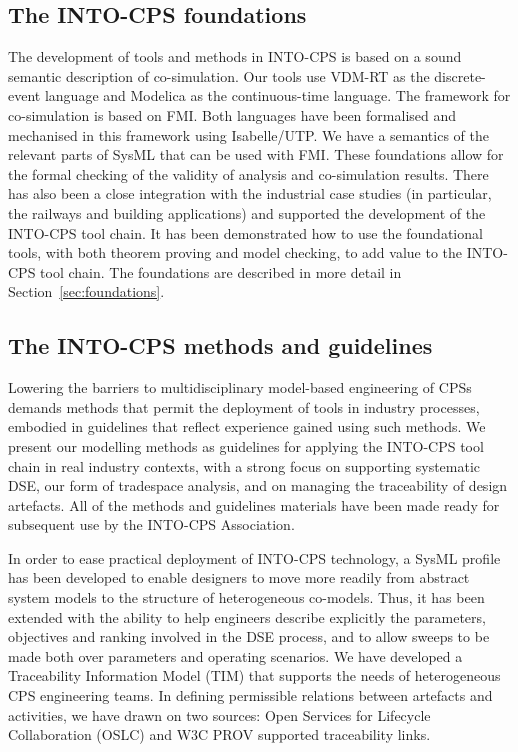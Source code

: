 \subsection{The INTO-CPS foundations}

The development of tools and methods in INTO-CPS is based on a sound semantic description of co-simulation. Our tools use VDM-RT as the discrete-event language and Modelica as the continuous-time language. The framework for co-simulation is based on FMI. Both languages have been formalised and mechanised in this framework using Isabelle/UTP. We have a semantics of the relevant parts of SysML that can be used with FMI. These foundations allow for the formal checking of the validity of analysis and co-simulation results. There has also been a close integration with the industrial case studies (in particular, the railways and building applications) and supported the development of the INTO-CPS tool chain. It has been demonstrated how to use the foundational tools, with both theorem proving and model checking, to add value to the INTO-CPS tool chain. The foundations are described in more detail in Section~\ref{sec:foundations}.

\subsection{The INTO-CPS methods and guidelines}

Lowering the barriers to multidisciplinary model-based engineering of CPSs demands methods that permit the deployment of tools in industry processes, embodied in guidelines that reflect experience gained using such methods. We present our modelling methods as guidelines for applying the INTO-CPS tool chain in real industry contexts, with a strong focus on supporting systematic DSE, our form of tradespace analysis, and on managing the traceability of design artefacts. All of the methods and guidelines materials have been made ready for subsequent use by the INTO-CPS Association.

In order to ease practical deployment of INTO-CPS technology, a SysML profile has been developed to enable designers to move more readily from abstract system models to the structure of heterogeneous co-models. Thus, it has been extended with the ability to help engineers describe explicitly the parameters, objectives and ranking involved in the DSE process, and to allow sweeps to be made both over parameters and operating scenarios. We have developed a Traceability Information Model (TIM) that supports the needs of heterogeneous CPS engineering teams. In defining permissible relations between artefacts and activities, we have drawn on two sources: Open Services for Lifecycle Collaboration (OSLC)  and W3C PROV supported traceability links.

